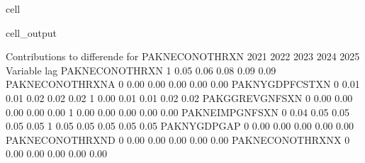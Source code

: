\documentclass[letterpaper,10pt,english]{jupyterBook}
\begin{document}
\begin{sphinxuseclass}{cell}
\begin{sphinxVerbatimOutput}
\begin{sphinxuseclass}{cell_output}
\begin{sphinxVerbatim}[commandchars=\\\{\}]
 Contributions to differende for  PAKNECONOTHRXN
                           2021       2022       2023       2024       2025
Variable         lag                                                       
PAKNECONOTHRXN   \PYGZhy{}1        0.05       0.06       0.08       0.09       0.09
PAKNECONOTHRXN\PYGZus{}A  0       \PYGZhy{}0.00      \PYGZhy{}0.00      \PYGZhy{}0.00      \PYGZhy{}0.00      \PYGZhy{}0.00
PAKNYGDPFCSTXN    0        0.01       0.01       0.02       0.02       0.02
                 \PYGZhy{}1       \PYGZhy{}0.00      \PYGZhy{}0.01      \PYGZhy{}0.01      \PYGZhy{}0.02      \PYGZhy{}0.02
PAKGGREVGNFSXN    0       \PYGZhy{}0.00      \PYGZhy{}0.00      \PYGZhy{}0.00      \PYGZhy{}0.00      \PYGZhy{}0.00
                 \PYGZhy{}1       \PYGZhy{}0.00      \PYGZhy{}0.00      \PYGZhy{}0.00      \PYGZhy{}0.00      \PYGZhy{}0.00
PAKNEIMPGNFSXN    0        0.04       0.05       0.05       0.05       0.05
                 \PYGZhy{}1       \PYGZhy{}0.05      \PYGZhy{}0.05      \PYGZhy{}0.05      \PYGZhy{}0.05      \PYGZhy{}0.05
PAKNYGDPGAP\PYGZus{}      0        0.00       0.00       0.00       0.00      \PYGZhy{}0.00
PAKNECONOTHRXN\PYGZus{}D  0       \PYGZhy{}0.00      \PYGZhy{}0.00      \PYGZhy{}0.00      \PYGZhy{}0.00      \PYGZhy{}0.00
PAKNECONOTHRXN\PYGZus{}X  0       \PYGZhy{}0.00      \PYGZhy{}0.00      \PYGZhy{}0.00      \PYGZhy{}0.00      \PYGZhy{}0.00


\end{sphinxVerbatim}
\end{sphinxuseclass}
\end{sphinxVerbatimOutput}
\end{sphinxuseclass}
\end{document}

